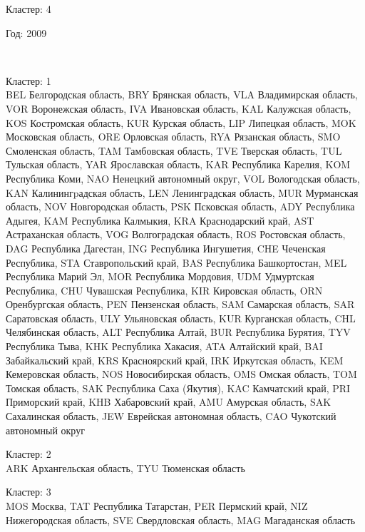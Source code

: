 \documentclass[11pt]{article}
\begin{document}
Кластер:  4 \\

\begin{center}
Год:  2009
\end{center}

    \begin{center}
    \end{center}
    { \hspace*{\fill} \\}
    
Кластер:  1 \\
BEL Белгородская область, BRY Брянская область, VLA Владимирская область, VOR Воронежская область, IVA Ивановская область, KAL Калужская область, KOS Костромская область, KUR Курская область, LIP Липецкая область, MOK Московская область, ORE Орловская область, RYA Рязанская область, SMO Смоленская область, TAM Тамбовская область, TVE Тверская область, TUL Тульская область, YAR Ярославская область, KAR Республика Карелия, KOM Республика Коми, NAO Ненецкий автономный округ, VOL Вологодская область, KAN Калинингpадская область, LEN Ленинградская область, MUR Мурманская область, NOV Новгородская область, PSK Псковская область, ADY Республика Адыгея, KAM Республика Калмыкия, KRA Краснодарский край, AST Астраханская область, VOG Волгоградская область, ROS Ростовская область, DAG Республика Дагестан, ING Республика Ингушетия, CHE Чеченская Республика, STA Ставропольский край, BAS Республика Башкортостан, MEL Республика Марий Эл, MOR Республика Мордовия, UDM Удмуртская Республика, CHU Чувашская Республика, KIR Кировская область, ORN Оренбургская область, PEN Пензенская область, SAM Самарская область, SAR Саратовская область, ULY Ульяновская область, KUR Курганская область, CHL Челябинская область, ALT Республика Алтай, BUR Республика Бурятия, TYV Республика Тыва, KHK Республика Хакасия, ATA Алтайский край, BAI Забайкальский край, KRS Красноярский край, IRK Иркутская область, KEM Кемеровская область, NOS Новосибирская область, OMS Омская область, TOM Томская область, SAK Республика Саха (Якутия), KAC Камчатский край, PRI Приморский край, KHB Хабаровский край, AMU Амурская область, SAK Сахалинская область, JEW Еврейская автономная область, CAO Чукотский автономный округ

Кластер:  2 \\
ARK Архангельская область, TYU Тюменская область

Кластер:  3 \\
MOS Москва, TAT Республика Татарстан, PER Пермский край, NIZ Нижегородская область, SVE Свердловская область, MAG Магаданская область
\end{document}
